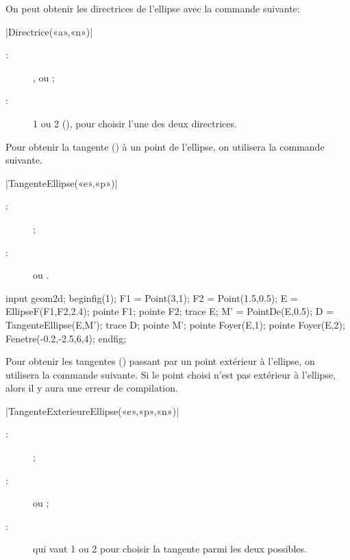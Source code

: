 \documentclass[a4paper,french]{article}
\begin{document}
On peut obtenir les directrices de l'ellipse avec la commande suivante:

\begin{colourband}
\macro|Directrice(«a»,«n»)|
\begin{description}
  \item[:]  ,  ou 
  ; 
  \item[:]  1 ou 2 (), pour choisir l'une des deux
  directrices. 
\end{description}
\end{colourband}
\bigskip

Pour obtenir la tangente () à un point de l'ellipse, on
utilisera la commande suivante.

\begin{colourband}
\macro|TangenteEllipse(«e»,«p»)|
\begin{description}
  \item[:]   ;
  \item[:]   ou .
\end{description}
\end{colourband}
\bigskip

\begin{ExempleMP}
input geom2d;
beginfig(1);
F1 = Point(3,1);
F2 = Point(1.5,0.5);
E = EllipseF(F1,F2,2.4);
pointe F1; pointe F2;
trace E;
M' = PointDe(E,0.5);
D = TangenteEllipse(E,M');
trace D;
pointe M';
pointe Foyer(E,1);
pointe Foyer(E,2);
Fenetre(-0.2,-2.5,6,4);
endfig;
\end{ExempleMP}


Pour obtenir les tangentes () passant par un point extérieur à
l'ellipse, on utilisera la commande suivante.  Si le point choisi n'est pas
extérieur à l'ellipse, alors il y aura une erreur de compilation.

\begin{colourband}
\macro|TangenteExterieureEllipse(«e»,«p»,«n»)|
\begin{description}
  \item[:]   ;
  \item[:]   ou  ;
  \item[:]  qui vaut 1 ou 2 pour choisir la tangente
  parmi les deux possibles.
\end{description}
\end{colourband}
\bigskip
\end{document}
